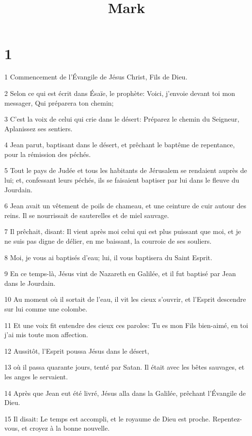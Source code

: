 

\title{Mark}


\chapter{1}

\par 1 Commencement de l'Évangile de Jésus Christ, Fils de Dieu.
\par 2 Selon ce qui est écrit dans Ésaïe, le prophète: Voici, j'envoie devant toi mon messager, Qui préparera ton chemin;
\par 3 C'est la voix de celui qui crie dans le désert: Préparez le chemin du Seigneur, Aplanissez ses sentiers.
\par 4 Jean parut, baptisant dans le désert, et prêchant le baptême de repentance, pour la rémission des péchés.
\par 5 Tout le pays de Judée et tous les habitants de Jérusalem se rendaient auprès de lui; et, confessant leurs péchés, ils se faisaient baptiser par lui dans le fleuve du Jourdain.
\par 6 Jean avait un vêtement de poils de chameau, et une ceinture de cuir autour des reins. Il se nourrissait de sauterelles et de miel sauvage.
\par 7 Il prêchait, disant: Il vient après moi celui qui est plus puissant que moi, et je ne suis pas digne de délier, en me baissant, la courroie de ses souliers.
\par 8 Moi, je vous ai baptisés d'eau; lui, il vous baptisera du Saint Esprit.
\par 9 En ce temps-là, Jésus vint de Nazareth en Galilée, et il fut baptisé par Jean dans le Jourdain.
\par 10 Au moment où il sortait de l'eau, il vit les cieux s'ouvrir, et l'Esprit descendre sur lui comme une colombe.
\par 11 Et une voix fit entendre des cieux ces paroles: Tu es mon Fils bien-aimé, en toi j'ai mis toute mon affection.
\par 12 Aussitôt, l'Esprit poussa Jésus dans le désert,
\par 13 où il passa quarante jours, tenté par Satan. Il était avec les bêtes sauvages, et les anges le servaient.
\par 14 Après que Jean eut été livré, Jésus alla dans la Galilée, prêchant l'Évangile de Dieu.
\par 15 Il disait: Le temps est accompli, et le royaume de Dieu est proche. Repentez-vous, et croyez à la bonne nouvelle.
